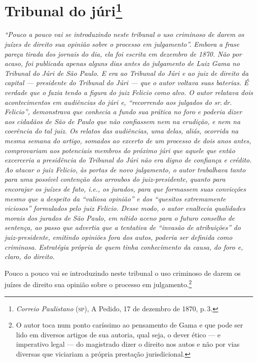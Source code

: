 \chapter{Tribunal do júri\footnote{\emph{Correio Paulistano} (\textsc{sp}), A Pedido, 17 de dezembro de 1870,
  p.\,3.}} %

\begin{didascalia}
\emph{``Pouco a pouco vai se introduzindo neste tribunal o uso criminoso
de darem os juízes de direito sua opinião sobre o processo em
julgamento''. Embora a frase pareça tirada dos jornais do dia, ela foi
escrita em dezembro de 1870. Não por acaso, foi publicada apenas alguns
dias antes do julgamento de Luiz Gama no Tribunal do Júri de São Paulo.
E era ao Tribunal do Júri e ao juiz de direito da capital --- presidente
do Tribunal do Júri --- que o autor voltava suas baterias. É verdade que
o fazia tendo a figura do juiz Felicio como alvo. O autor relatava dois
acontecimentos em audiências do júri e, ``recorrendo aos julgados do sr.\,dr.\,Felicio'', demonstrava que conhecia a fundo sua prática no foro e
poderia dizer aos cidadãos de São de Paulo que não confiassem nem na
erudição, e nem na coerência do tal juiz. Os relatos das audiências, uma
delas, aliás, ocorrida na mesma semana do artigo, somados ao excerto de
um processo de dois anos antes, comprovariam aos potenciais membros do
próximo júri que aquele que então excerceria a presidência do Tribunal
do Júri não era digno de confiança e crédito. Ao atacar o juiz Felicio,
às portas de novo julgamento, o autor trabalhava tanto para uma possível
contenção dos arroubos do juiz-presidente, quanto para encorajar os
juízes de fato, i.e., os jurados, para que formassem suas convicções
mesmo que a despeito da ``valiosa opinião'' e dos ``quesitos extremamente
viciosos'' formulados pelo juiz Felicio. Desse modo, o autor enaltecia
qualidades morais dos jurados de São Paulo, em nítido aceno para o
futuro conselho de sentença, ao passo que advertia que a tentativa de
``invasão de atribuições'' do juiz-presidente, emitindo opiniões fora dos
autos, poderia ser definida como criminosa. Estratégia própria de quem
tinha conhecimento da causa, do foro e, claro, do direito.}
\end{didascalia}

Pouco a pouco vai se introduzindo neste tribunal o uso criminoso de
darem os juízes de direito sua opinião sobre o processo em
julgamento.\footnote{ O autor toca num ponto caríssimo ao pensamento de
  Gama e que pode ser lido em diversos artigos de sua autoria, qual
  seja, o dever ético --- e imperativo legal --- do magistrado dizer o
  direito nos autos e não por vias diversas que viciariam a própria
  prestação jurisdicional.}

